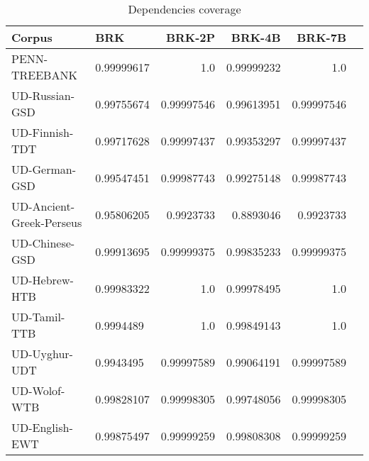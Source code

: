         \begin{table}[h]
            \centering
            \caption{Dependencies coverage}
            \label{tab:dcoverage}
            \begin{tabular}{llrrrr}
                \hline
                Corpus                      &   BRK      &  BRK-2P      &  BRK-4B    &  BRK-7B    \\
                \hline
                PENN-TREEBANK               & 0.99999617 &        1.0   & 0.99999232 &        1.0 \\
                UD-Russian-GSD              & 0.99755674 & 0.99997546   & 0.99613951 & 0.99997546 \\
                UD-Finnish-TDT              & 0.99717628 & 0.99997437   & 0.99353297 & 0.99997437 \\
                UD-German-GSD               & 0.99547451 & 0.99987743   & 0.99275148 & 0.99987743 \\
                UD-Ancient-Greek-Perseus    & 0.95806205 &  0.9923733   &  0.8893046 &  0.9923733 \\
                UD-Chinese-GSD              & 0.99913695 & 0.99999375   & 0.99835233 & 0.99999375 \\
                UD-Hebrew-HTB               & 0.99983322 &        1.0   & 0.99978495 &        1.0 \\
                UD-Tamil-TTB                & 0.9994489  &        1.0   & 0.99849143 &        1.0 \\
                UD-Uyghur-UDT               & 0.9943495  & 0.99997589   & 0.99064191 & 0.99997589 \\
                UD-Wolof-WTB                & 0.99828107 & 0.99998305   & 0.99748056 & 0.99998305 \\
                UD-English-EWT              & 0.99875497 & 0.99999259   & 0.99808308 & 0.99999259 \\
                \hline
            \end{tabular}
        \end{table}



